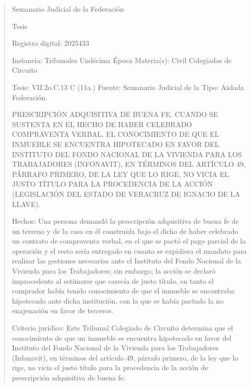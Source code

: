 \documentclass[11pt,a4paper]{article}
\begin{document}
\begin{quote}
                                                   Semanario Judicial de la Federación

                                                 Tesis

 Registro digital: 2025433

 Instancia: Tribunales              Undécima Época                         Materia(s): Civil
 Colegiados de Circuito

 Tesis: VII.2o.C.13 C (11a.)        Fuente: Semanario Judicial de la       Tipo: Aislada
                                    Federación.


PRESCRIPCIÓN ADQUISITIVA DE BUENA FE. CUANDO SE SUSTENTA EN EL HECHO DE
HABER CELEBRADO COMPRAVENTA VERBAL, EL CONOCIMIENTO DE QUE EL INMUEBLE
SE ENCUENTRA HIPOTECADO EN FAVOR DEL INSTITUTO DEL FONDO NACIONAL DE LA
VIVIENDA PARA LOS TRABAJADORES (INFONAVIT), EN TÉRMINOS DEL ARTÍCULO 49,
PÁRRAFO PRIMERO, DE LA LEY QUE LO RIGE, NO VICIA EL JUSTO TÍTULO PARA LA
PROCEDENCIA DE LA ACCIÓN (LEGISLACIÓN DEL ESTADO DE VERACRUZ DE IGNACIO DE
LA LLAVE).


Hechos: Una persona demandó la prescripción adquisitiva de buena fe de un terreno y de la casa
en él construida bajo el dicho de haber celebrado un contrato de compraventa verbal, en el que se
pactó el pago parcial de la operación y el resto sería entregado en cuanto se expidiera el mandato
para realizar las gestiones necesarias ante el Instituto del Fondo Nacional de la Vivienda para los
Trabajadores; sin embargo, la acción se declaró improcedente al estimarse que carecía de justo
título, en tanto el comprador había tenido conocimiento de que el inmueble se encontraba
hipotecado ante dicha institución, con la que se había pactado la no enajenación en favor de
terceros.

Criterio jurídico: Este Tribunal Colegiado de Circuito determina que el conocimiento de que un
inmueble se encuentra hipotecado en favor del Instituto del Fondo Nacional de la Vivienda para los
Trabajadores (Infonavit), en términos del artículo 49, párrafo primero, de la ley que lo rige, no vicia el
justo título para la procedencia de la acción de prescripción adquisitiva de buena fe.


\end{quote}
\end{document}
